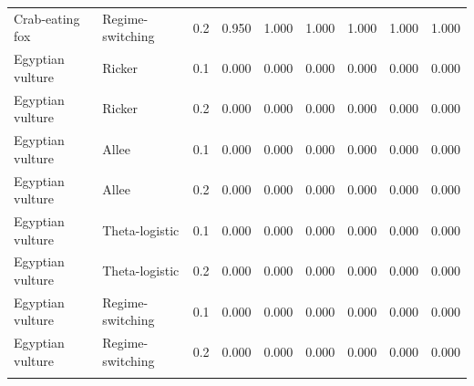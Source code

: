 \documentclass[10pt]{article}
\begin{document}
\begin{landscape}
\begin{center}
\begin{longtable}{@{}llc*{6}{r}@{}}
Crab-eating fox & Regime-switching & 0.2 & 0.950 & 1.000 & 1.000 & 1.000 & 1.000 & 1.000 \\
\addlinespace[2pt]
Egyptian vulture & Ricker & 0.1 & 0.000 & 0.000 & 0.000 & 0.000 & 0.000 & 0.000 \\
Egyptian vulture & Ricker & 0.2 & 0.000 & 0.000 & 0.000 & 0.000 & 0.000 & 0.000 \\
Egyptian vulture & Allee & 0.1 & 0.000 & 0.000 & 0.000 & 0.000 & 0.000 & 0.000 \\
Egyptian vulture & Allee & 0.2 & 0.000 & 0.000 & 0.000 & 0.000 & 0.000 & 0.000 \\
Egyptian vulture & Theta-logistic & 0.1 & 0.000 & 0.000 & 0.000 & 0.000 & 0.000 & 0.000 \\
Egyptian vulture & Theta-logistic & 0.2 & 0.000 & 0.000 & 0.000 & 0.000 & 0.000 & 0.000 \\
Egyptian vulture & Regime-switching & 0.1 & 0.000 & 0.000 & 0.000 & 0.000 & 0.000 & 0.000 \\
Egyptian vulture & Regime-switching & 0.2 & 0.000 & 0.000 & 0.000 & 0.000 & 0.000 & 0.000 \\
\addlinespace[2pt]
\end{longtable}
\end{center}
\end{landscape}
\end{document}
